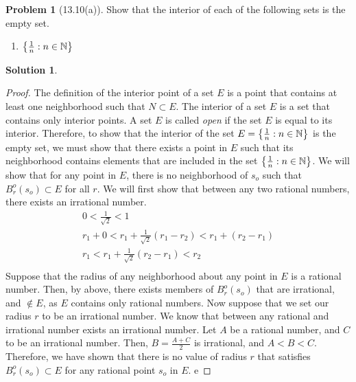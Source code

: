 \documentclass[12pt]{article}
\theoremstyle{definition} %
\newtheorem{solution}{Solution}
\newtheorem{problem}{Problem}
\theoremstyle{plain} %
\begin{document}
\begin{problem}[13.10(a)]
Show that the interior of each of the following sets is the empty set.
\begin{enumerate}
    \item \(\left\{ \frac{1}{n}:n\in\mathbb{\MakeUppercase{n}}  \right\} \) 
\end{enumerate}
\end{problem}

\begin{solution}
   \item \begin{proof}
    The definition of the interior point of a set \(E\) is a point that contains at least one neighborhood such that \(N\subset E\). The interior of a set \(E\) is a set that contains only interior points. A set \(E\) is called \emph{open} if the set \(E\) is equal to its interior. Therefore, to show that the interior of the set \(E=\left\{ \frac{1}{n}:n\in \mathbb{\MakeUppercase{n}}  \right\} \) is the empty set, we must show that there exists a point in \(E\) such that its neighborhood
    contains elements that are included in the set \(\left\{ \frac{1}{n}:n\in\mathbb{\MakeUppercase{n}}  \right\}\). 
    We will show that for any point in \(E\), there is no neighborhood of \(s_{o} \) such that \(B_{r}^{o}(s_{o} )\subset E \) for all \(r\). We will first show that between any two rational numbers, there exists an irrational number.
    \begin{align}
        0<\frac{1}{\sqrt{2} }<1 \\[10pt] 
        r_{1} + 0 < r_{1} + \frac{1}{\sqrt{2} }(r_{1} -r_{2} )<r_{1} +(r_{2} -r_{1} )\\[10pt] 
        r_{1} <r_{1} +\frac{1}{\sqrt{2} }(r_{2} -r_{1} )<r_{2} \\[10pt] 
    \end{align}
    Suppose that the radius of any neighborhood about any point in \(E\) is a rational number. Then, by above, there exists members of \(B_{r}^{o}(s_{o} )\) that are irrational, and \(\notin E \), as \(E\) contains only rational numbers. Now suppose that we set our radius \(r\) to be an irrational number. We know that between any rational and irrational number exists an irrational number. Let \(A\)  be a rational number, and \(C\)  to be an irrational number. Then, \(B=\frac{A+C}{2}\) is irrational, and \(A<B<C\). Therefore, we have shown that there is no value of radius \(r\) that satisfies \(B_{r}^{o}(s_{o} )\subset E\) for any rational point \(s_{o} \) in \(E\).  e
   \end{proof} 
\end{solution}
\end{document}
